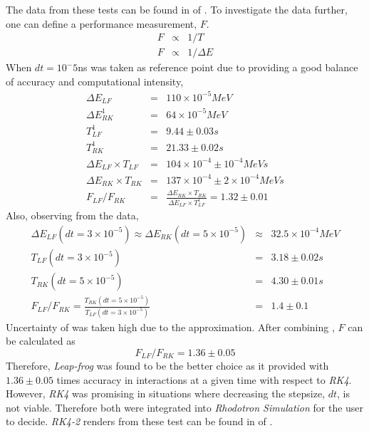 \documentclass{book}
\begin{document}
The data from these tests can be found in  of .
To investigate the data further, one can define a performance measurement, $F$.
\begin{eqnarray*}
    F &\propto& 1/T \\
    F &\propto& 1/\Delta E 
\end{eqnarray*}
When $dt=10^-5$ns was taken as reference point due to providing a good balance of accuracy and computational intensity,
\begin{eqnarray} \label{eq:f_lf_rk_mag_1}
    \Delta E_{LF} &=& 110 \times 10^{-5} MeV \nonumber\\
    \Delta E_{RK}^1 &=& 64 \times 10^{-5} MeV \nonumber\\
    T_{LF}^1 &=& 9.44 \pm 0.03 s \nonumber\\
    T_{RK}^1 &=& 21.33 \pm 0.02 s \nonumber\\
    \Delta E_{LF} \times T_{LF} &=& 104 \times 10^{-4} \pm 10^{-4} MeV s \nonumber\\ %
    \Delta E_{RK} \times T_{RK} &=& 137 \times 10^{-4} \pm 2\times 10^{-4}  MeV s \nonumber\\ %
    F_{LF}/F_{RK} &=& \frac{\Delta E_{RK} \times T_{RK} }{\Delta E_{LF} \times T_{LF}^1} = 1.32 \pm 0.01
\end{eqnarray}
Also, observing from the data,
\begin{eqnarray} \label{eq:f_lf_rk_mag_2}
    \Delta E_{LF} (dt=3 \times 10^{-5}) \approx \Delta E_{RK} (dt=5 \times 10^{-5}) &\approx& 32.5 \times 10^{-4} MeV \nonumber\\
    T_{LF}(dt=3 \times 10^{-5})  &=& 3.18 \pm 0.02 s \nonumber\\ %
    T_{RK}(dt=5 \times 10^{-5})  &=& 4.30 \pm 0.01 s \nonumber\\ %
    F_{LF}/F_{RK} = \frac{T_{RK}(dt=5 \times 10^{-5})}{T_{LF}(dt=3 \times 10^{-5})} &=& 1.4 \pm 0.1
\end{eqnarray}
Uncertainty of  was taken high due to the approximation. After combining , $F$ can be calculated as
\begin{equation}
    F_{LF}/F_{RK} = 1.36 \pm 0.05
\end{equation}
Therefore, \textit{Leap-frog} was found to be the better choice as it provided with $1.36 \pm 0.05$ times accuracy in \eB interactions at a given time with respect to \textit{RK4}. However,
\textit{RK4} was promising in situations where decreasing the stepsize, $dt$, is not viable. Therefore both were integrated into \textit{Rhodotron Simulation} for the user to decide.
\textit{RK4-2} renders from these test can be found in  of .
\end{document}
